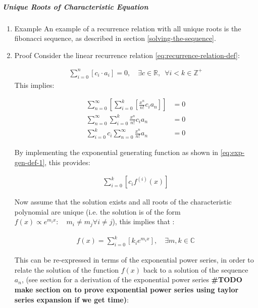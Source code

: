 \documentclass[11pt]{article}
\begin{document}
\subparagraph{Unique Roots of Characteristic Equation}
\label{uniq-roots-recurrence}
\begin{enumerate}
\item Example
\label{sec:orgf440bd1}
An example of a recurrence relation with all unique roots is the fibonacci sequence, as described in section \ref{solving-the-sequence}.
\item Proof
\label{sec:org33cbec6}
Consider the linear recurrence relation \eqref{eq:recurrence-relation-def}:

\begin{align}
\sum^{n}_{i= 0}   \left[ c_i \cdot  a_i \right] = 0, \quad \exists c \in
\mathbb{R}, \enspace \forall i<k\in\mathbb{Z}^+ \nonumber \label{eq:recurrence-relation-def}
\end{align}
This implies:


\begin{align}
    \sum^{\infty}_{n= 0}   \left[ \sum^{k}_{i= 0}   \left[ \frac{x^n}{n!} c_i a_n \right]  \right]  &= 0 \\
    \sum^{\infty}_{n= 0}    \sum^{k}_{i= 0}    \frac{x^n}{n!} c_i a_n    &= 0 \\
        \sum^{k}_{i= 0} c_i \sum^{\infty}_{n= 0}    \frac{x^n}{n!}  a_n    &= 0
\end{align}

By implementing the exponential generating function as shown in
\eqref{eq:exp-gen-def-1}, this provides:

\begin{align}
   \sum^{k}_{i= 0}   \left[ c_i f^{\left( i \right)}\left( x \right) \right]
\end{align}


Now assume that the solution exists and all roots of the characteristic polynomial are unique (i.e. the solution is of the form \(f{\left({ x }\right)} \propto e^{m_i x}: \quad m_i \neq m_j \forall i\neq j\)), this implies that  \cite[Ch. 4]{zillDifferentialEquations2009a} :

\begin{align}
    f{\left({ x }\right)} = \sum^{k}_{i= 0}   {\left[{ k_i e^{m_i x} }\right]}, \quad \exists m,k \in \mathbb{C} \nonumber
\end{align}

This can be re-expressed in terms of the exponential power series, in order to relate the solution of the function \(f{\left({ x }\right)}\) back to a solution of the sequence \(a_n\), (see section for a derivation of the exponential power series \textbf{\#TODO make section on to prove exponential power series using taylor series expansion if we get time)}:


\end{enumerate}
\end{document}
